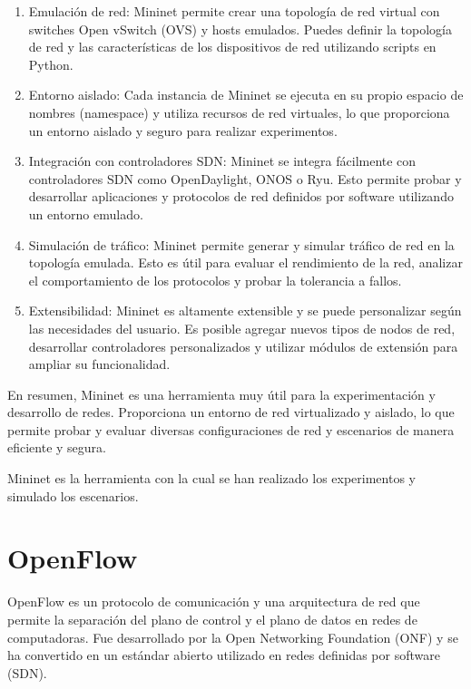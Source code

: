 \documentclass[a4paper, 12pt]{book}
\begin{document}
	\begin{enumerate}
		\item 	Emulación de red: Mininet permite crear una topología de red virtual con switches Open vSwitch (OVS) y hosts emulados. Puedes definir la topología de red y las características de los dispositivos de red utilizando scripts en Python.
		\item 	Entorno aislado: Cada instancia de Mininet se ejecuta en su propio espacio de nombres (namespace) y utiliza recursos de red virtuales, lo que proporciona un entorno aislado y seguro para realizar experimentos.
		\item 	Integración con controladores SDN: Mininet se integra fácilmente con controladores SDN como OpenDaylight, ONOS o Ryu. Esto permite probar y desarrollar aplicaciones y protocolos de red definidos por software utilizando un entorno emulado.
		\item 	Simulación de tráfico: Mininet permite generar y simular tráfico de red en la topología emulada. Esto es útil para evaluar el rendimiento de la red, analizar el comportamiento de los protocolos y probar la tolerancia a fallos.
		\item   Extensibilidad: Mininet es altamente extensible y se puede personalizar según las necesidades del usuario. Es posible agregar nuevos tipos de nodos de red, desarrollar controladores personalizados y utilizar módulos de extensión para ampliar su funcionalidad.
	\end{enumerate}
	
	
	En resumen, Mininet es una herramienta muy útil para la experimentación y desarrollo de redes. Proporciona un entorno de red virtualizado y aislado, lo que permite probar y evaluar diversas configuraciones de red y escenarios de manera eficiente y segura.
	
	Mininet es la herramienta con la cual se han realizado los experimentos y simulado los escenarios.
	
	\section{OpenFlow}
	\label{sec:openflow}
	
	
	OpenFlow es un protocolo de comunicación y una arquitectura de red que permite la separación del plano de control y el plano de datos en redes de computadoras. Fue desarrollado por la Open Networking Foundation (ONF) y se ha convertido en un estándar abierto utilizado en redes definidas por software (SDN).
	
\end{document}
